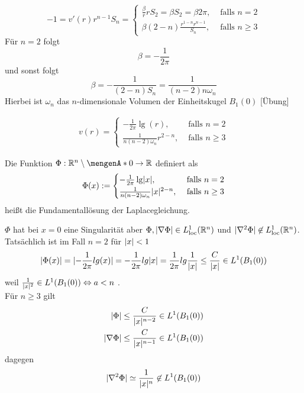 \begin{equation}
	-1 = v'(r) r^{n-1} S_n = \begin{cases}
		\frac{\beta}{r}r S_2 = \beta S_2 = \beta 2 \pi, &\text{ falls } n=2\\
		\beta (2-n) \frac{r^{1-n}r^{n-1} }{  S_n}, &\text{ falls } n \geq 3
	\end{cases}
\end{equation}
Für $n=2$ folgt
\[
	\beta = - \frac{1}{2 \pi}
\] 
und sonst folgt
\[
	\beta = -\frac{1}{(2-n)S_n} = \frac{1}{(n-2)n\omega_n}
\]
Hierbei ist $\omega_n$ das $n$-dimensionale Volumen der Einheitskugel $B_1(0)$ [Übung]

\begin{align*}
	v(r) = \begin{cases}
		-\frac{1}{2 \pi} \lg(r), &\text{ falls }n=2\\
		\frac{1}{n (n-2) \omega_n } r^{2-n}, &\text{ falls }n \geq 3
	\end{cases}
\end{align*}

\begin{definition}
	Die Funktion $\Phi: \mathbb{R}^n \setminus \set{0} \to \mathbb{R}$ definiert als
	\begin{equation}
		\Phi(x) := \begin{cases}
			-\frac{1}{2 \pi} \lg \lvert x\rvert, &\text{ falls }n=2\\
			\frac{1}{n (n-2) \omega_n } \lvert x\rvert^{2-n}, &\text{ falls }n \geq 3
		\end{cases}
	\end{equation}
	heißt die Fundamentallösung der Laplacegleichung.
\end{definition}

\begin{bemerkung}
	$\Phi$ hat bei $x=0$ eine Singularität aber $\Phi , \lvert \nabla \Phi\rvert \in L^1_{\text{loc}}(\mathbb{R}^n)$ und $ \lvert \nabla^2 \Phi\rvert \not\in L^1_{\text{loc}}(\mathbb{R}^n) $. Tatsächlich ist im Fall $n=2$ für $\lvert x\rvert < 1$
	\[
		\lvert \Phi (x)\rvert = \lvert - \frac{1}{2 \pi} lg(x)\rvert = - \frac{1}{2 \pi} lg \lvert x\rvert = \frac{1}{2 \pi} lg \frac{1}{\lvert x\rvert} \leq  \frac{C}{\lvert x\rvert} \in L^1(B_1(0)) 
	\]
	weil $ \frac{1}{\lvert x\rvert^2} \in L^1(B_1(0)) \Leftrightarrow a < n$ . \\
	Für $n \geq 3$ gilt
	\begin{align*}
		\lvert \Phi\rvert &\leq \frac{C}{\lvert x\rvert^{n-2}} \in L^1(B_1(0)) \\
		\lvert  \nabla  \Phi\rvert &\leq \frac{C}{\lvert x\rvert^{n-1}} \in  L^1 ( B_1(0)) 
	\end{align*}
	dagegen 
	\begin{equation}
		\lvert  \nabla^2 \Phi \rvert \simeq \frac{1}{\lvert x\rvert^n} \not\in L^1(B_1(0))
	\end{equation}
\end{bemerkung}

